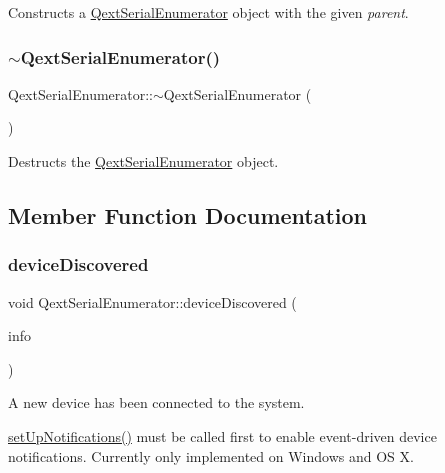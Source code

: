 Constructs a \hyperlink{classQextSerialEnumerator}{Qext\+Serial\+Enumerator} object with the given {\itshape parent}. \mbox{\label{classQextSerialEnumerator_ae4d0507728ffb990606ff8dde3da6e6d}} 
\subsubsection{\texorpdfstring{$\sim$\+Qext\+Serial\+Enumerator()}{~QextSerialEnumerator()}}
{\footnotesize\ttfamily Qext\+Serial\+Enumerator\+::$\sim$\+Qext\+Serial\+Enumerator (\begin{DoxyParamCaption}{ }\end{DoxyParamCaption})}

Destructs the \hyperlink{classQextSerialEnumerator}{Qext\+Serial\+Enumerator} object. 

\subsection{Member Function Documentation}
\mbox{\label{classQextSerialEnumerator_a8cd71a66dcd0079328dae193a3e58100}} 
\subsubsection{\texorpdfstring{device\+Discovered}{deviceDiscovered}}
{\footnotesize\ttfamily void Qext\+Serial\+Enumerator\+::device\+Discovered (\begin{DoxyParamCaption}\item[{const \hyperlink{structQextPortInfo}{Qext\+Port\+Info} \&}]{info }\end{DoxyParamCaption})\hspace{0.3cm}{\ttfamily [signal]}}

A new device has been connected to the system.

\hyperlink{classQextSerialEnumerator_a5a8caf21f4ad519323f13219651274ec}{set\+Up\+Notifications()} must be called first to enable event-\/driven device notifications. Currently only implemented on Windows and OS X.

